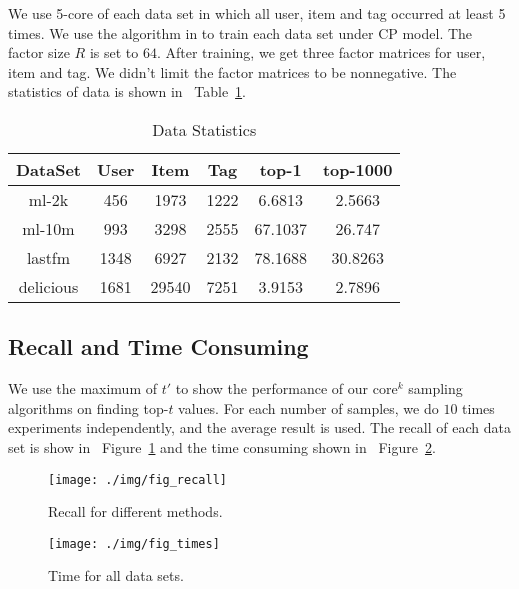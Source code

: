 \documentclass[letterpaper]{article}
\newcommand{\Fig}[1]   {Figure~\ref{fig:#1}}
\newcommand{\Table}[1] {Table~\ref{table:#1}}
\begin{document}
We use 5-core of each data set in which all user, item and tag occurred at least 5 times.
We use the algorithm in \cite{Rendle_RTF} to train each data set under CP model.
The factor size $R$ is set to $64$.
After training, we get three factor matrices for user, item and tag.
We didn't limit the factor matrices to be nonnegative.
The statistics of data is shown in ~\Table{Data}.
\begin{table}[]
  \centering
  \begin{tabular}{|c|c|c|c|c|c|}
    \hline
    DataSet     & User & Item    & Tag    & top-1   & top-1000\\
    \hline
    ml-2k       & 456  &  1973   &  1222  & 6.6813  & 2.5663 \\
    ml-10m      & 993  &  3298   &  2555  & 67.1037 & 26.747 \\
    lastfm      & 1348 &  6927   &  2132  & 78.1688 & 30.8263\\
    delicious   & 1681 &  29540  &  7251  & 3.9153  & 2.7896 \\
    \hline
  \end{tabular}
  \caption{Data Statistics}
  \label{table:Data}
\end{table}

\subsection{Recall and Time Consuming}
We use the maximum of $t'$
to show the performance of our core$^k$ sampling algorithms on finding top-$t$ values.
For each number of samples, we do $10$ times experiments independently,
and the average result is used.
The recall of each data set is show in ~\Fig{recall}
and the time consuming shown in ~\Fig{times}.
\begin{figure}[H]
  \centering
  \texttt{[image: ./img/fig\_recall]}\\
  \caption{Recall for different methods.}
  \label{fig:recall}
\end{figure}
\begin{figure}[ht]
  \centering
  \texttt{[image: ./img/fig\_times]}\\
  \caption{Time for all data sets.}
  \label{fig:times}
\end{figure}
\end{document}
